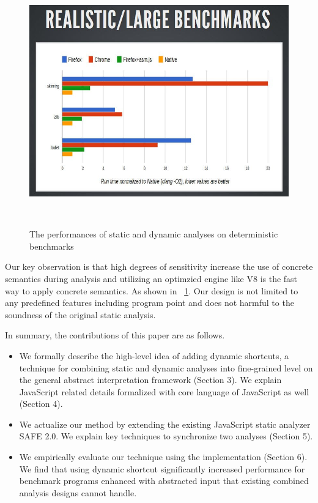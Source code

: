 \begin{figure}[h]
  \centering
  \label{intro:fig:performance}
  \includegraphics[width=\linewidth]{benchmark_performance}
  \caption{The performances of static and dynamic analyses on deterministic benchmarks}
  \
  \Description{}
\end{figure}

Our key observation is that high degrees of sensitivity increase the use of
concrete semantics during analysis and utilizing an optimzied engine like V8 is
the fast way to apply concrete semantics.
As shown in ~\ref{intro:fig:performance}.
Our design is not limited to any predefined features including program point and
does not harmful to the soundness of the original static analysis.



In summary, the contributions of this paper are as follows.
\begin{itemize}
\item We formally describe the high-level idea of adding dynamic shortcuts, a
  technique for combining static and dynamic analyses into fine-grained level on
  the general abstract interpretation framework (Section 3).
  We explain JavaScript related details formalized with core language of JavaScript as well (Section 4).
\item We actualize our method by extending the existing JavaScript static analyzer SAFE 2.0.
  We explain key techniques to synchronize two analyses (Section 5).
\item We empirically evaluate our technique using the implementation (Section 6).
  We find that using dynamic shortcut significantly increased performance for
  benchmark programs enhanced with abstracted input that existing combined
  analysis designs cannot handle.
\end{itemize}

